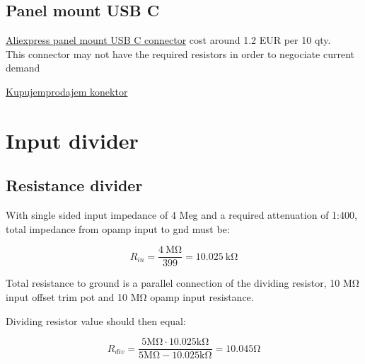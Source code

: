 \documentclass[11pt]{article}
\begin{document}
\subsection{Panel mount USB C}

\href{https://www.aliexpress.com/item/1005005795420370.html?spm=a2g0o.detail.pcDetailTopMoreOtherSeller.8.7952vy1gvy1gDZ&gps-id=pcDetailTopMoreOtherSeller&scm=1007.40000.327270.0&scm_id=1007.40000.327270.0&scm-url=1007.40000.327270.0&pvid=2700dcaa-0eb6-4b0e-88eb-943a58278a62&_t=gps-id:pcDetailTopMoreOtherSeller,scm-url:1007.40000.327270.0,pvid:2700dcaa-0eb6-4b0e-88eb-943a58278a62,tpp_buckets:668%232846%238115%232000&pdp_npi=4%40dis%21RSD%2122.34%2118.09%21%21%210.21%210.17%21%402101ef5e17281249438301346ebeab%2112000034381437374%21rec%21SRB%21%21ABXZ&utparam-url=scene%3ApcDetailTopMoreOtherSeller%7Cquery_from%3A}{Aliexpress panel mount USB C connector}
cost around 1.2 EUR per 10 qty.\\

This connector may not have the required resistors in order to negociate 
current demand

\href{https://www.kupujemprodajem.com/elektronika-i-komponente/moduli-za-samoizgradnju/usb-c-konektor-za-montazu/oglas/149804414?filterId=4441321394}{Kupujemprodajem konektor}

\section{Input divider}
\subsection{Resistance divider}
With single sided input impedance of 4 Meg and a required attenuation of 1:400, total
impedance from opamp input to gnd must be:

\begin{equation}
  R_{in} = \frac{4\ \si{\mega \ohm}}{399} = 10.025\ \si{\kilo \ohm}
  \label{eq:res_to_gnd}
\end{equation}

Total resistance to ground is a parallel connection of the dividing resistor,
10 \si{\mega \ohm} input offset trim pot and 10 \si{\mega \ohm} opamp input resistance.

Dividing resistor value should then equal:

\begin{equation}
  R_{div} = \frac{5 \si{\mega \ohm} \cdot 
  10.025 \si{\kilo \ohm}}{5 \si{\mega \ohm} - 10.025 \si{\kilo \ohm}} = 
  10.045 \si{\ohm}
  \label{eq:input_divider}
\end{equation}
\end{document}
